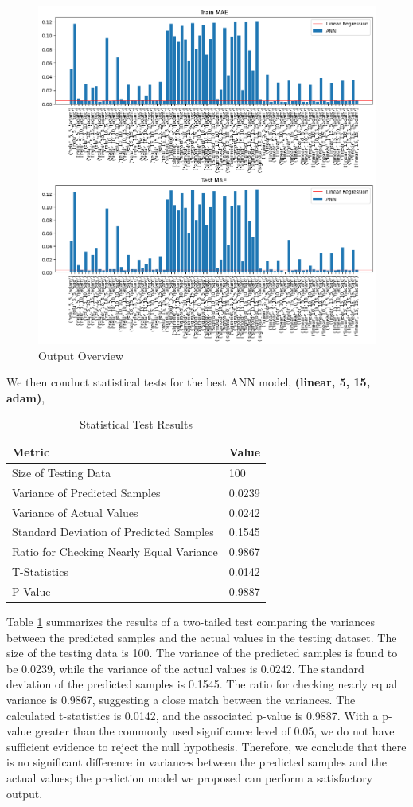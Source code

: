 \documentclass[manuscript,screen,review,nonacm]{acmart}
\begin{document}
\begin{figure}
  \centering
  \includegraphics[width=0.8\linewidth]{output.png}
  \caption{Output Overview}
  \label{fig:output}
\end{figure}

We then conduct statistical tests for the best ANN model, \textbf{(linear, 5, 15, adam)},

\begin{table}[h]
  \centering
  \begin{tabular}{|l|l|}
  \hline
  \textbf{Metric} & \textbf{Value} \\
  \hline
  Size of Testing Data & 100 \\
  Variance of Predicted Samples & 0.0239 \\
  Variance of Actual Values & 0.0242 \\
  Standard Deviation of Predicted Samples & 0.1545 \\
  Ratio for Checking Nearly Equal Variance & 0.9867 \\
  T-Statistics & 0.0142 \\
  P Value & 0.9887 \\
  \hline
  \end{tabular}
  \caption{Statistical Test Results}
  \label{tab:statistical_results}
\end{table}
  
Table \ref{tab:statistical_results} summarizes the results of a two-tailed test comparing the variances between the predicted samples and the actual values in the testing dataset. The size of the testing data is 100. The variance of the predicted samples is found to be 0.0239, while the variance of the actual values is 0.0242. The standard deviation of the predicted samples is 0.1545. The ratio for checking nearly equal variance is 0.9867, suggesting a close match between the variances. The calculated t-statistics is 0.0142, and the associated p-value is 0.9887. With a p-value greater than the commonly used significance level of 0.05, we do not have sufficient evidence to reject the null hypothesis. Therefore, we conclude that there is no significant difference in variances between the predicted samples and the actual values; the prediction model we proposed can perform a satisfactory output.


\end{document}
